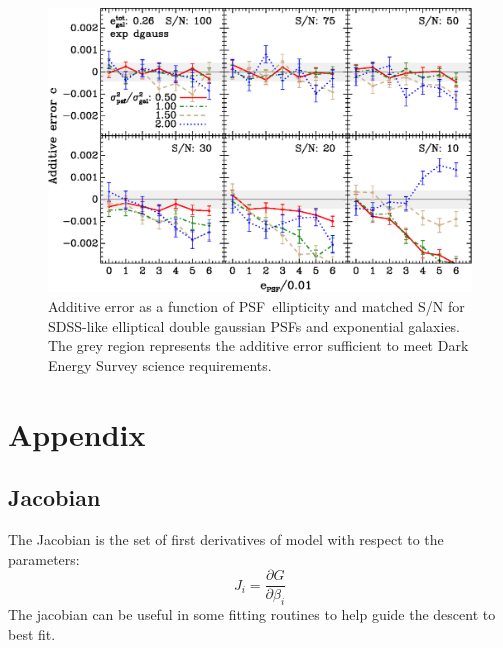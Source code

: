 \documentclass[10pt,preprint]{aastex}
\newcommand{\psf}{PSF}
\begin{document}
\begin{figure}[t] \centering
 \centering 
 \includegraphics[scale=1]{figures/set-epsf-edg01-yr-0.003-0.003-vs-epsf.eps}

 \caption{Additive error as a function of \psf\ ellipticity and matched S/N for
 SDSS-like elliptical double gaussian \psf s and exponential galaxies.  The grey
 region represents the additive error sufficient to meet Dark
 Energy Survey science requirements.  }

 \label{fig:edgadderr}

\end{figure}







\appendix 

\section{Appendix}
\subsection{Jacobian}

The Jacobian is the set of first derivatives of model with respect
to the parameters:
\begin{equation}
J_i = \frac{\partial G}{\partial \beta_i}
\end{equation}
The jacobian can be useful in some fitting routines to help guide the descent
to best fit.
\end{document}

